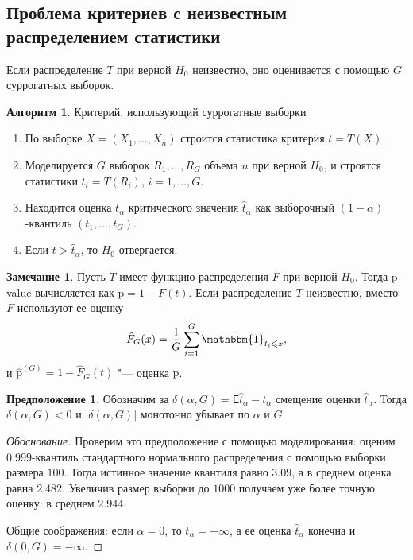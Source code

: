 \documentclass[specialist,
substylefile = spbu_report.rtx,
subf,href,colorlinks=true, 12pt]{disser}
\theoremstyle{definition}
\newtheorem{algorithm}{Алгоритм}
\newtheorem{remark}{Замечание}
\newtheorem{asumption}{Предположение}
\begin{document}
\subsection{Проблема критериев с неизвестным распределением статистики}\label{sect:problem}
Если распределение $T$ при верной $H_0$ неизвестно, оно оценивается с помощью $G$ суррогатных выборок.
\begin{algorithm}{Критерий, использующий суррогатные выборки}\label{alg:surrogate}
	\begin{enumerate}
		\item По выборке $X=(X_1,\ldots, X_n)$ строится статистика критерия $t=T(X)$.
		\item Моделируется $G$ выборок $R_1,\ldots, R_G$ объема $n$ при верной $H_0$, и строятся статистики $t_i=T(R_i)$, $i=1,\ldots, G$.
		\item Находится оценка $t_\alpha$ критического значения $\hat t_\alpha$ как выборочный $(1-\alpha)$-квантиль $(t_1,\ldots,t_G)$.
		\item Если $t>\hat t_\alpha$, то $H_0$ отвергается.
	\end{enumerate}
\end{algorithm}

\begin{remark}
	Пусть $T$ имеет функцию распределения $F$ при верной $H_0$. Тогда p-value вычисляется как $\mathrm p= 1-F(t)$. Если распределение $T$ неизвестно, вместо $F$ используют ее оценку
	\[
		\hat F_G(x)=\frac{1}G\sum_{i=1}^G \mathbbm{1}_{t_i\leqslant x}, 
	\]
	и $\hat {\mathrm p}^{(G)} = 1 - \hat F_G(t)$ "--- оценка $\mathrm p$.
\end{remark}

\begin{asumption}\label{asumption1}
	Обозначим за $\delta(\alpha,G)=\mathsf E\hat t_\alpha - t_\alpha$ смещение оценки $\hat t_\alpha$. Тогда $\delta(\alpha, G)<0$ и $|\delta(\alpha, G)|$ монотонно убывает по $\alpha$ и $G$.
	\end{asumption}

\begin{proof}[Обоснование]
	Проверим это предположение с помощью моделирования: оценим \\ $0.999$-квантиль стандартного нормального распределения с помощью выборки размера $100$. Тогда истинное значение квантиля равно $3.09$, а в среднем оценка равна $2.482$. Увеличив размер выборки до $1000$ получаем уже более точную оценку: в среднем $2.944$.

	Общие соображения: если $\alpha=0$, то $t_\alpha=+\infty$, а ее оценка $\hat t_\alpha$ конечна и \linebreak$\delta(0, G)=-\infty$.
\end{proof}
\end{document}
